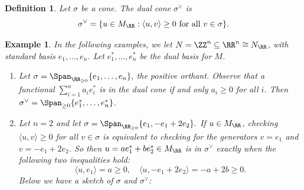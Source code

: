 \documentclass[12pt]{amsart}
\theoremstyle{plain}
\newtheorem{definition}[theorem]{Definition}
\newtheorem{example}[theorem]{Example}
\begin{document}
\begin{definition}
Let $\sigma$ be a cone.
The \emph{dual cone} $\sigma^\vee$ is
$$\sigma^\vee = \{u \in M_\RR : \langle u, v \rangle \ge 0 \text{ for all } v \in \sigma\}.$$
\end{definition}

\begin{example}
In the following examples, we let $N = \ZZ^n \subseteq \RR^n \cong N_\RR$, with standard basis $e_1, \ldots, e_n$.
Let $e_1^*, \ldots, e_n^*$ be the dual basis for $M$.
\begin{enumerate}
\item
Let $\sigma = \Span_{\RR_{\ge 0}}\{e_1, \ldots, e_n\},$ the \emph{positive orthant}.
Observe that a functional $\sum_{i=1}^n a_i e_i^*$ is in the dual cone if and only $a_i \ge 0$ for all $i$.
Then $\sigma^\vee = \Span_{\ge 0}\{e_1^*, \ldots, e_n^*\}$.

\item
Let $n = 2$ and let $\sigma = \Span_{\RR_{\ge 0}} \{e_1, - e_1 + 2 e_2\}.$
If $u \in M_\RR$, checking $\langle u, v \rangle \ge 0$ for all $v \in \sigma$ is equivalent to checking for the generators $v = e_1$ and $v = -e_1 + 2 e_2$.
So then $u = a e_1^* + b e_2^* \in M_\RR$ is in $\sigma^\vee$ exactly when the following two inequalities hold:
$$\langle u, e_1 \rangle = a \ge 0, \quad \langle u, -e_1 + 2e_2 \rangle = -a + 2b \ge 0.$$
Below we have a sketch of $\sigma$ and $\sigma^\vee$:
\begin{figure}[H]
    \centering
\end{figure}
\end{enumerate}
\end{example}
\end{document}
